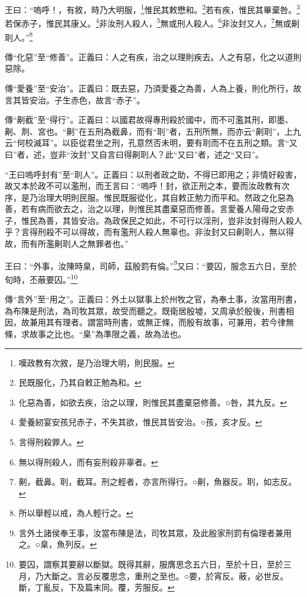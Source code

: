 王曰：“嗚呼！，有敘，時乃大明服，\footnote{嘆政教有次敘，是乃治理大明，則民服。}惟民其敕懋和。\footnote{民既服化，乃其自敕正勉為和。}若有疾，惟民其畢棄咎。\footnote{化惡為善，如欲去疾，治之以理，則惟民其盡棄惡修善。○咎，其九反。}若保赤子，惟民其康乂。\footnote{愛養紉宴安孩兒赤子，不失其欲，惟民其皆安治。○孩，亥才反。}非汝刑人殺人，\footnote{言得刑殺罪人。}無或刑人殺人。\footnote{無以得刑殺人，而有妄刑殺非辜者。}非汝封又人，\footnote{劓，截鼻。刵，截耳。刑之輕者，亦言所得行。○劓，魚器反。刵，如志反。}無或劓刵人。”\footnote{所以舉輕以戒，為人輕行之。}


{\noindent\zhuan{}\fzbyks 傳“化惡”至“修善”。正義曰：人之有疾，治之以理則疾去。人之有惡，化之以道則惡除。 \par}

{\noindent\zhuan{}\fzbyks 傳“愛養”至“安治”。正義曰：既去惡，乃須愛養之為善，人為上養，則化所行，故言其皆安治。子生赤色，故言“赤子”。 \par}

{\noindent\zhuan{}\fzbyks 傳“劓截”至“得行”。正義曰：以國君故得專刑殺於國中，而不可濫其刑，即墨、劓、剕、宮也。“劓”在五刑為截鼻，而有“刵”者，五刑所無，而亦云“劓刵”，上九云“何校滅耳”。以臣從君坐之刑，孔意然否未明，要有刵而不在五刑之類。言“又曰”者，述，豈非“汝封”又自言曰得劓刵人？此“又曰”者，述之“又曰”。 \par}

{\noindent\shu{}\fzkt “王曰嗚呼封有”至“刵人”。正義曰：以刑者政之助，不得已即用之；非情好殺害，故又本於政不可以濫刑，而王言曰：“嗚呼！封，欲正刑之本，要而汝政教有次序，是乃治理大明則民服。惟民既服從化，其自敕正勉力而平和。然政之化惡為善，若有病而欲去之，治之以理，則惟民其盡棄惡而修善。言愛養人陽母之安赤子，惟民為善，其皆安治。為政保民之如此，不可行以淫刑，豈非汝封得刑人殺人乎？言得刑殺不可以得故，而有濫刑人殺人無辜也。非汝封又曰劓刵人，無以得故，而有所濫劓刵人之無罪者也。” \par}

王曰：“外事，汝陳時臬，司師，茲殷罰有倫。”\footnote{言外土諸侯奉王事，汝當布陳是法，司牧其眾，及此殷家刑罰有倫理者兼用之。○臬，魚列反。}又曰：“要囚，服念五六日，至於旬時，丕蔽要囚。”\footnote{要囚，謂察其要辭以斷獄。既得其辭，服膺思念五六日，至於十日，至於三月，乃大斷之。言必反覆思念，重刑之至也。○要，於宵反。蔽，必世反。斷，丁亂反，下及篇末同。覆，芳服反。}


{\noindent\zhuan{}\fzbyks 傳“言外”至“用之”。正義曰：外土以獄事上於州牧之官，為奉土事，汝當用刑書，為布陳是刑法，為司牧其眾，故受而聽之。既衛居殷墟，又周承於殷後，刑書相因，故兼用其有理者。謂當時刑書，或無正條，而殷有故事，可兼用，若今律無條，求故事之比也。“臬”為準限之義，故為法也。 \par}

